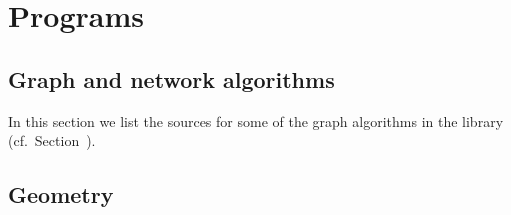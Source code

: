 \chapter{Programs}

\label{Programs}

\bigskip
\section{Graph and network algorithms}

\label{Graph and network algorithms}

In this section we list the \CC sources for some of the graph algorithms
in the library (cf.~Section~).




\newpage
\section{Geometry}

\label{Geometry}






